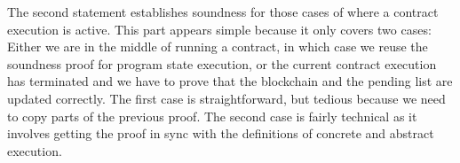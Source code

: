 The second  statement establishes soundness for those cases of 
where a contract execution is active.
This part appears simple because it only covers two cases:
Either we are in the middle of running a contract, in which case we
reuse the soundness proof for program state execution, or
the current contract execution has terminated and we have to prove that
the blockchain and the pending list are updated correctly.
The first case is straightforward, but tedious because we need to copy
parts of the previous proof.
The second case is fairly technical as it involves getting the proof in
sync with the definitions of concrete and abstract execution.



